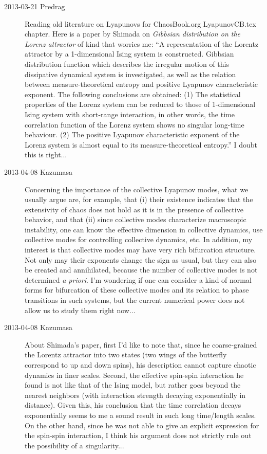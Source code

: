 \begin{description}
\item[2013-03-21 Predrag]
Reading old literature on Lyapunovs for ChaosBook.org LyapunovCB.tex
chapter. Here is a paper by Shimada on {\em Gibbsian
distribution on the {Lorenz} attractor} of kind that worries me: ``A
representation of the Lorentz attractor by a 1-dimensional Ising
system is constructed. Gibbsian distribution function which describes
the irregular motion of this dissipative dynamical system is
investigated, as well as the relation between measure-theoretical
entropy and positive Lyapunov characteristic exponent. The following
conclusions are obtained: (1) The statistical properties of the
Lorenz system can be reduced to those of 1-dimensional Ising system
with short-range interaction, in other words, the time correlation
function of the Lorenz system shows no singular long-time behaviour.
(2) The positive Lyapunov characteristic exponent of the Lorenz
system is almost equal to its measure-theoretical entropy.'' I doubt
this is right...

\item[2013-04-08 Kazumasa]
Concerning the importance of the collective Lyapunov modes,
 what we usually argue are, for example, that (i) their existence indicates
 that the extensivity of chaos does not hold as it is
 in the presence of collective behavior, and that (ii) since
 collective modes characterize macroscopic instability, one can know
 the effective dimension in collective dynamics, use collective modes
 for controlling collective dynamics, etc.
In addition, my interest is that collective modes may have
 very rich bifurcation structure.
Not only may their exponents change the sign as usual,
 but they can also be created and annihilated,
 because the number of collective modes is not determined \textit{a priori}.
I'm wondering if one can consider a kind of normal forms
 for bifurcation of these collective modes
 and its relation to phase transitions in such systems,
 but the current numerical power does not allow us to study them right now...

\item[2013-04-08 Kazumasa]
About Shimada's paper, first I'd like to note that,
 since he coarse-grained the Lorentz attractor into two states
 (two wings of the butterfly correspond to up and down spins),
 his description cannot capture chaotic dynamics in finer scales.
Second, the effective spin-spin interaction he found
 is not like that of the Ising model,
 but rather goes beyond the nearest neighbors
 (with interaction strength decaying exponentially in distance).
Given this, his conclusion that the time correlation decays exponentially
 seems to me a sound result in such long time/length scales.
On the other hand, since he was not able to give an explicit expression
 for the spin-spin interaction, I think his argument does not strictly rule out
 the possibility of a singularity...


\end{description}
